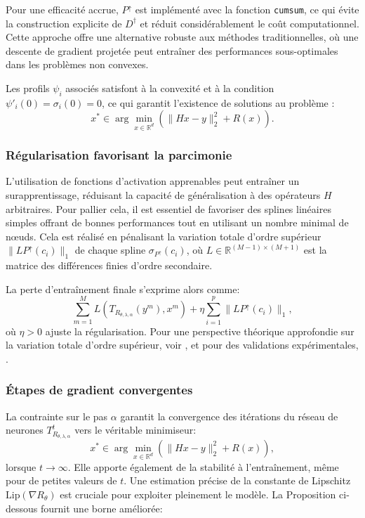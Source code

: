 \documentclass[a4paper, 12pt]{report} %
\begin{document}
Pour une efficacité accrue, \( P^{\uparrow} \) est implémenté avec la fonction \texttt{cumsum}, ce qui évite la construction explicite de \( D^{\dagger} \) et réduit considérablement le coût computationnel. Cette approche offre une alternative robuste aux méthodes traditionnelles, où une descente de gradient projetée peut entraîner des performances sous-optimales dans les problèmes non convexes.

Les profils \( \psi_i \) associés satisfont à la convexité et à la condition \( \psi'_i(0) = \sigma_i(0) = 0 \), ce qui garantit l’existence de solutions au problème :
\[
x^* \in \arg \min_{x \in \mathbb{R}^d} \left( \| Hx - y \|_2^2 + R(x) \right).
\]

\subsubsection{Régularisation favorisant la parcimonie}

L'utilisation de fonctions d'activation apprenables peut entraîner un surapprentissage, réduisant la capacité de généralisation à des opérateurs \( H \) arbitraires. Pour pallier cela, il est essentiel de favoriser des splines linéaires simples offrant de bonnes performances tout en utilisant un nombre minimal de nœuds. Cela est réalisé en pénalisant la variation totale d'ordre supérieur \( \| L P^{\uparrow}(c_i) \|_1 \) de chaque spline \( \sigma_{P^{\uparrow}}(c_i) \), où \( L \in \mathbb{R}^{(M-1) \times (M+1)} \) est la matrice des différences finies d'ordre secondaire.

La perte d'entraînement finale s'exprime alors comme:
\[
\sum_{m=1}^{M} L \left( T_{R_{\theta, \lambda, \alpha}}(y^m), x^m \right) + \eta \sum_{i=1}^{p} \| L P^{\uparrow}(c_i) \|_1,
\]
où \( \eta > 0 \) ajuste la régularisation. Pour une perspective théorique approfondie sur la variation totale d'ordre supérieur, voir \cite{unser2019representer}, et pour des validations expérimentales, \cite{bohra2020learning}.

\subsubsection{Étapes de gradient convergentes}

La contrainte sur le pas \( \alpha \) garantit la convergence des itérations du réseau de neurones \( T_{R_{\theta, \lambda, \alpha}}^t \) vers le véritable minimiseur:
\[
x^* \in \arg \min_{x \in \mathbb{R}^d} \left( \| Hx - y \|_2^2 + R(x) \right),
\]
lorsque \( t \to \infty \). Elle apporte également de la stabilité à l'entraînement, même pour de petites valeurs de \( t \). Une estimation précise de la constante de Lipschitz \( \text{Lip}(\nabla R_\theta) \) est cruciale pour exploiter pleinement le modèle. La Proposition ci-dessous fournit une borne améliorée:
\end{document}
